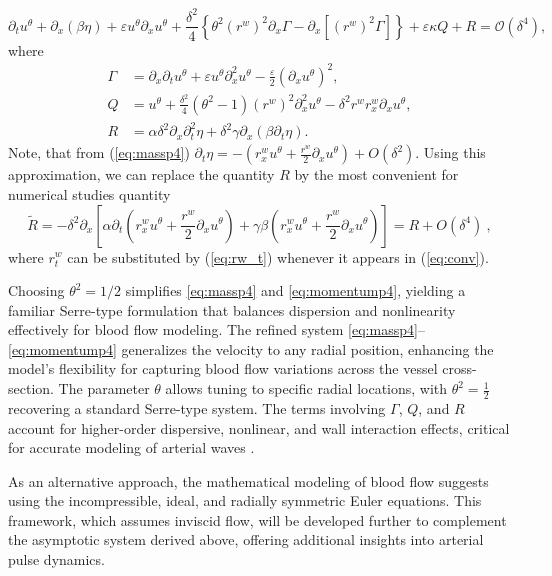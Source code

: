 \documentclass[alpha-refs, 12pt]{wiley-article}
\renewcommand{\O}{\mathcal{O}}
\newcommand{\eps}{\varepsilon}
\begin{document}
\begin{equation}\label{eq:momentump4}
  \partial_t u^\theta + \partial_x (\beta \eta) + \eps u^\theta \partial_x u^\theta + \frac{\delta^2}{4} \left\{ \theta^2 (r^w)^2 \partial_x \Gamma - \partial_x [(r^w)^2 \Gamma] \right\} + \eps \kappa Q + R = \O(\delta^4),
\end{equation}
where
\begin{equation}\label{eq:gamman}
\begin{aligned}
  \Gamma &= \partial_x \partial_t u^\theta + \eps u^\theta \partial_x^2 u^\theta - \frac{\eps}{2} (\partial_x u^\theta)^2, \\
  Q &= u^\theta + \frac{\delta^2}{4} (\theta^2 - 1) (r^w)^2 \partial_x^2 u^\theta - \delta^2 r^w r^w_x \partial_x u^\theta, \\
  R &= \alpha \delta^2 \partial_x \partial_t^2 \eta + \delta^2 \gamma \partial_x (\beta \partial_t \eta).
\end{aligned}
\end{equation}
Note, that from (\ref{eq:massp4}) $\partial_t\eta=-\left(r_x^w u^\theta+\frac{r^w}{2}\partial_xu^\theta\right)+O(\delta^2)$. Using this approximation, we can replace the quantity $R$ by the most convenient for numerical studies quantity
\begin{equation}\label{eq:conv} 
\tilde{R}=-\delta^2 \partial_x\left[ \alpha \partial_t\left(r_x^w u^\theta+\frac{r^w}{2}\partial_xu^\theta\right)+\gamma \beta \left(r_x^w u^\theta+\frac{r^w}{2}\partial_xu^\theta\right)\right]=R+O(\delta^4)\ ,
\end{equation}
where $r_t^w$ can be substituted by (\ref{eq:rw_t}) whenever it appears in (\ref{eq:conv}).


Choosing $\theta^2 = {1}/{2}$ simplifies \eqref{eq:massp4} and \eqref{eq:momentump4}, yielding a familiar Serre-type formulation that balances dispersion and nonlinearity effectively for blood flow modeling. The refined system \eqref{eq:massp4}--\eqref{eq:momentump4} generalizes the velocity to any radial position, enhancing the model's flexibility for capturing blood flow variations across the vessel cross-section. The parameter $\theta$ allows tuning to specific radial locations, with $\theta^2 = \frac{1}{2}$ recovering a standard Serre-type system. The terms involving $\Gamma$, $Q$, and $R$ account for higher-order dispersive, nonlinear, and wall interaction effects, critical for accurate modeling of arterial waves \citep{Mitsotakis2019}.

As an alternative approach, the mathematical modeling of blood flow suggests using the incompressible, ideal, and radially symmetric Euler equations. This framework, which assumes inviscid flow, will be developed further to complement the asymptotic system derived above, offering additional insights into arterial pulse dynamics.
\end{document}
